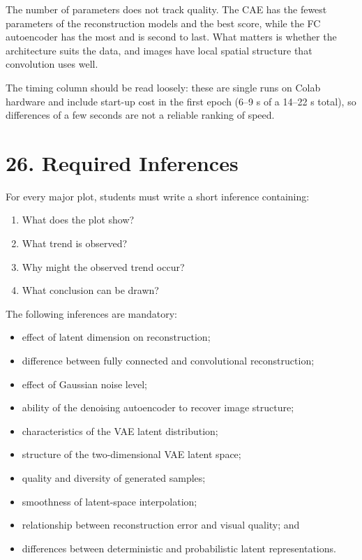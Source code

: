 \documentclass[10pt]{article}
\begin{document}
The number of parameters does not track quality. The CAE has the fewest
parameters of the reconstruction models and the best score, while the FC
autoencoder has the most and is second to last. What matters is whether the
architecture suits the data, and images have local spatial structure that
convolution uses well.

The timing column should be read loosely: these are single runs on Colab hardware
and include start-up cost in the first epoch (6--9 s of a 14--22 s total), so
differences of a few seconds are not a reliable ranking of speed.

\section*{26. Required Inferences}

For every major plot, students must write a short inference containing:

\begin{enumerate}
\item What does the plot show?
\item What trend is observed?
\item Why might the observed trend occur?
\item What conclusion can be drawn?
\end{enumerate}

The following inferences are mandatory:

\begin{itemize}
\item effect of latent dimension on reconstruction;
\item difference between fully connected and convolutional reconstruction;
\item effect of Gaussian noise level;
\item ability of the denoising autoencoder to recover image structure;
\item characteristics of the VAE latent distribution;
\item structure of the two-dimensional VAE latent space;
\item quality and diversity of generated samples;
\item smoothness of latent-space interpolation;
\item relationship between reconstruction error and visual quality; and
\item differences between deterministic and probabilistic latent representations.
\end{itemize}
\end{document}
